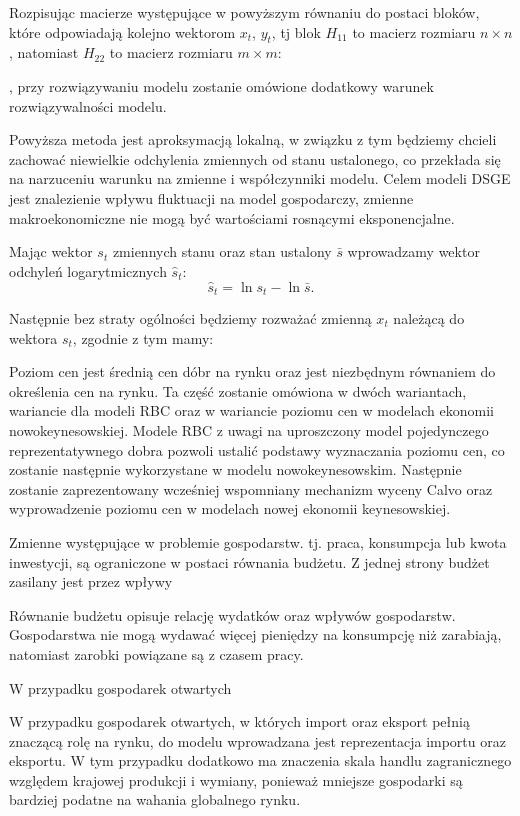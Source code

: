 Rozpisując macierze występujące w powyższym równaniu do postaci bloków, które odpowiadają kolejno wektorom $x_t$, $y_t$, tj blok $H_{11}$ to macierz rozmiaru $n \times n$, natomiast $H_{22}$ to macierz rozmiaru $m \times m$:

, przy rozwiązywaniu modelu zostanie omówione dodatkowy warunek rozwiązywalności modelu.

Powyższa metoda jest aproksymacją lokalną, w związku z tym będziemy chcieli zachować niewielkie odchylenia zmiennych od stanu ustalonego, co przekłada się na narzuceniu warunku na zmienne i współczynniki modelu. Celem modeli DSGE jest znalezienie wpływu fluktuacji na model gospodarczy, zmienne makroekonomiczne nie mogą być wartościami rosnącymi eksponencjalne.

Mając wektor $s_t$ zmiennych stanu oraz stan ustalony $\bar{s}$ wprowadzamy wektor odchyleń logarytmicznych $\hat{s}_t$:
\begin{equation}
    \hat{s}_t = \ln s_t - \ln \bar{s}.
\end{equation}

Następnie bez straty ogólności będziemy rozważać zmienną $x_t$ należącą do wektora $s_t$, zgodnie z tym mamy:




Poziom cen jest średnią cen dóbr na rynku oraz jest niezbędnym równaniem do
określenia cen na rynku. Ta część zostanie omówiona w dwóch wariantach, wariancie dla
modeli RBC oraz w wariancie poziomu cen w modelach ekonomii nowokeynesowskiej.
Modele RBC z uwagi na uproszczony model pojedynczego reprezentatywnego dobra
pozwoli ustalić podstawy wyznaczania poziomu cen, co zostanie następnie wykorzystane
w modelu nowokeynesowskim. Następnie zostanie zaprezentowany wcześniej wspomniany
mechanizm wyceny Calvo oraz wyprowadzenie poziomu cen w modelach nowej ekonomii
keynesowskiej.

Zmienne występujące w problemie gospodarstw. tj. praca, konsumpcja lub kwota inwestycji, są ograniczone w postaci równania budżetu. Z jednej strony budżet zasilany jest przez wpływy

Równanie budżetu opisuje relację wydatków oraz wpływów gospodarstw. Gospodarstwa nie mogą wydawać więcej pieniędzy na konsumpcję niż zarabiają, natomiast zarobki powiązane są z czasem pracy. 

W przypadku gospodarek otwartych

W przypadku gospodarek otwartych, w których import oraz eksport pełnią znaczącą rolę na rynku, do modelu wprowadzana jest reprezentacja importu oraz eksportu. W tym przypadku dodatkowo ma znaczenia skala handlu zagranicznego względem krajowej produkcji i wymiany, ponieważ mniejsze gospodarki są bardziej podatne na wahania globalnego rynku. 

